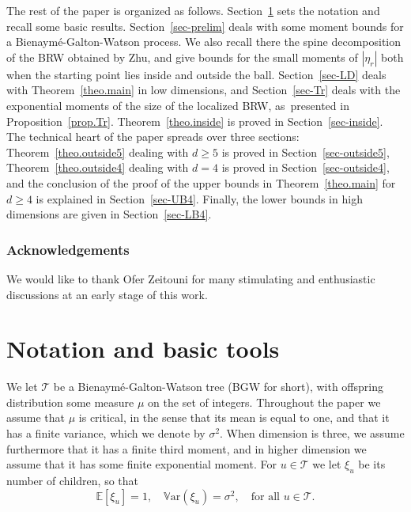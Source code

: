 \documentclass[11pt]{article}
\numberwithin{equation}{section}
\theoremstyle{plain}
\theoremstyle{definition}
\newcommand{\1}{{\text{\Large $\mathfrak 1$}}}
\begin{document}
The rest of the paper is organized as follows.
Section~\ref{sec-notation} sets the notation and
recall some basic results.
Section~\ref{sec-prelim} deals with some moment bounds for
a Bienaymé-Galton-Watson process. We also
recall there the spine decomposition of the BRW obtained by Zhu,
and give bounds for the small moments of
$|\eta_r|$ both when the starting point lies inside and outside the ball.
Section~\ref{sec-LD} deals with Theorem~\ref{theo.main} in low dimensions,
and Section~\ref{sec-Tr} deals with the
exponential moments of the size of the localized BRW, as~presented in Proposition~\ref{prop.Tr}. Theorem~\ref{theo.inside} is proved
in Section~\ref{sec-inside}. The technical heart of the paper
spreads over three sections: Theorem~\ref{theo.outside5} dealing with $d\ge 5$ is proved in
Section~\ref{sec-outside5}, Theorem~\ref{theo.outside4} dealing with $d=4$ is proved in Section~\ref{sec-outside4}, and the conclusion of the proof of the upper bounds in Theorem~\ref{theo.main} for $d\ge 4$ is explained in Section~\ref{sec-UB4}. Finally, the lower
bounds in high dimensions are given in Section~\ref{sec-LB4}.

\subsubsection*{Acknowledgements}
We would like to thank Ofer Zeitouni for many stimulating and enthusiastic discussions at an early stage of this work.

\section{Notation and basic tools}\label{sec-notation}

We let $\mathbf{\mathcal T}$ be a Bienaymé-Galton-Watson tree (BGW for short),
with offspring distribution some measure $\mu$ on the set of integers. Throughout the paper we assume that $\mu$ is critical, in the sense that its mean is equal to one, and that it has a finite variance, which we denote by $\sigma^2$.
When dimension is three, we assume furthermore that it has a finite third moment, and in higher dimension we assume that it has some finite exponential moment.
For $u\in \mathbf{\mathcal T}$
we let $\xi_u$ be its number of children, so that
\[
\mathbb E[\xi_u]= 1, \quad \mathbb V\text{ar}(\xi_u)= \sigma^2,
\quad \text{for all }u \in \mathbf{\mathcal T}.
\]
\end{document}

